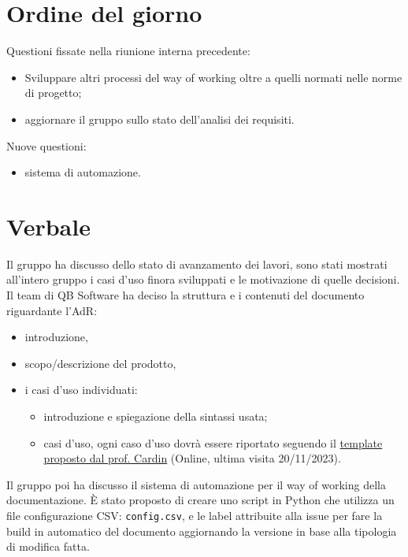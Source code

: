 \documentclass[12pt]{article}
\begin{document}
    \section{Ordine del giorno}
    Questioni fissate nella riunione interna precedente:
    \begin{itemize}
    	\item Sviluppare altri processi del way of working oltre a quelli normati nelle norme
    	di progetto;
    	\item aggiornare il gruppo sullo stato dell’analisi dei requisiti.
    \end{itemize}
    
    Nuove questioni:
    \begin{itemize}
    	\item sistema di automazione.
    \end{itemize}
    
    \section{Verbale}
    Il gruppo ha discusso dello stato di avanzamento dei lavori, sono stati mostrati all'intero gruppo i casi d'uso finora sviluppati e le motivazione di quelle decisioni. Il team di QB Software ha deciso la struttura e i contenuti del documento riguardante l'AdR:
    \begin{itemize}
    	\item introduzione,
    	\item scopo/descrizione del prodotto,
    	\item i casi d'uso individuati:
    	\begin{itemize}
    		\item introduzione e spiegazione della sintassi usata;
    		\item casi d'uso, ogni caso d'uso dovrà essere riportato seguendo il \href{https://github.com/rcardin/swe-imdb/blob/main/use-cases/template.md}{template proposto dal prof. Cardin} (Online, ultima visita 20/11/2023).
    	\end{itemize}
    \end{itemize}
    \noindent
    Il gruppo poi ha discusso il sistema di automazione per il way of working della documentazione. È stato proposto di creare uno script in Python che utilizza un file configurazione CSV: \verb|config.csv|, e le label attribuite alla issue per fare la build in automatico del documento aggiornando la versione in base alla tipologia di modifica fatta.
     
\end{document}
